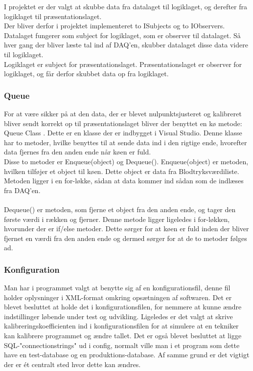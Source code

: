I projektet er der valgt at skubbe data fra datalaget til logiklaget, og derefter fra logiklaget til præsentationslaget. \\ 
Der bliver derfor i projektet implementeret to ISubjects og to IObservers. Datalaget fungerer som subject for logiklaget, som er observer til datalaget. Så hver gang der bliver læste tal ind af DAQ’en, skubber datalaget disse data videre til logiklaget. \\
Logiklaget er subject for præsentationslaget. Præsentationslaget er observer for logiklaget, og får derfor skubbet data op fra logiklaget.
\subsubsection{Queue}
For at være sikker på at den data, der er blevet nulpunktsjusteret og kalibreret bliver sendt korrekt op til præsentationslaget bliver der benyttet en kø metode: Queue Class \cite{queue}. Dette er en klasse der er indbygget i Visual Studio. Denne klasse har to metoder, hvilke benyttes til at sende data ind i den rigtige ende, hvorefter data fjernes fra den anden ende når køen er fuld. \\Disse to metoder er Enqueue(object) og Dequeue(). Enqueue(object) er metoden, hvilken tilføjer et object til køen. Dette object er data fra Blodtryksværdiliste. Metoden ligger i en for-løkke, sådan at data kommer ind sådan som de indlæses fra DAQ'en. \\\\
Dequeue() er metoden, som fjerne et object fra den anden ende, og tager den første værdi i rækken og fjerner. Denne metode ligger ligeledes i for-løkken, hvorunder der er if/else metoder. Dette sørger for at køen er fuld inden der bliver fjernet en værdi fra den anden ende og dermed sørger for at de to metoder følges ad.
\subsubsection{Konfiguration}
Man har i programmet valgt at benytte sig af en konfigurationsfil, denne fil holder oplysninger i XML-format omkring opsætningen af softwaren. Det er blevet besluttet at holde det i konfigurationsfilen, for nemmere at kunne ændre indstillinger løbende under test og udvikling. Ligeledes er det valgt at skrive kalibreringskoefficienten ind i konfigurationsfilen for at simulere at en tekniker kan kalibrere programmet og ændre tallet. Det er også blevet besluttet at ligge SQL-"connectionstrings" ud i config, normalt ville man i et program som dette have en test-database og en produktions-database. Af samme grund er det vigtigt der er ét centralt sted hvor dette kan ændres.
